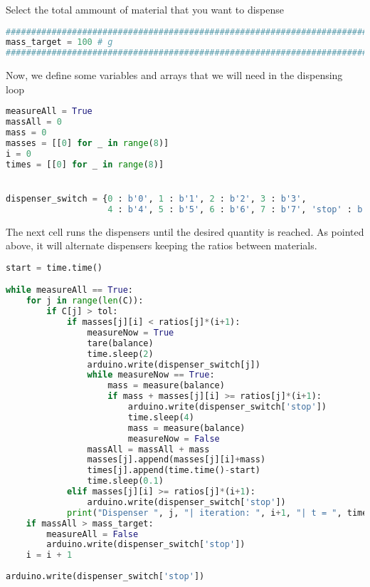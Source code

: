 Select the total ammount of material that you want to dispense

\begin{lstlisting}[language=Python]
###############################################################################
mass_target = 100 # g
###############################################################################
\end{lstlisting}

Now, we define some variables and arrays that we will need in the
dispensing loop

\begin{lstlisting}[language=Python]
measureAll = True
massAll = 0
mass = 0
masses = [[0] for _ in range(8)]
i = 0
times = [[0] for _ in range(8)]


dispenser_switch = {0 : b'0', 1 : b'1', 2 : b'2', 3 : b'3', 
                    4 : b'4', 5 : b'5', 6 : b'6', 7 : b'7', 'stop' : b'8'}
\end{lstlisting}

The next cell runs the dispensers until the desired quantity is reached.
As pointed above, it will alternate dispensers keeping the ratios
between materials.

\begin{lstlisting}[language=Python]
start = time.time()

while measureAll == True:
    for j in range(len(C)):
        if C[j] > tol:
            if masses[j][i] < ratios[j]*(i+1):
                measureNow = True
                tare(balance)
                time.sleep(2)
                arduino.write(dispenser_switch[j])
                while measureNow == True:
                    mass = measure(balance)
                    if mass + masses[j][i] >= ratios[j]*(i+1):
                        arduino.write(dispenser_switch['stop'])
                        time.sleep(4)
                        mass = measure(balance)
                        measureNow = False
                massAll = massAll + mass
                masses[j].append(masses[j][i]+mass)
                times[j].append(time.time()-start)
                time.sleep(0.1)
            elif masses[j][i] >= ratios[j]*(i+1):
                arduino.write(dispenser_switch['stop'])
            print("Dispenser ", j, "| iteration: ", i+1, "| t = ", times[j][i+1], "s | ", "mass : ", masses[j][i+1])                  
    if massAll > mass_target:
        measureAll = False
        arduino.write(dispenser_switch['stop'])
    i = i + 1
    
arduino.write(dispenser_switch['stop'])
\end{lstlisting}

